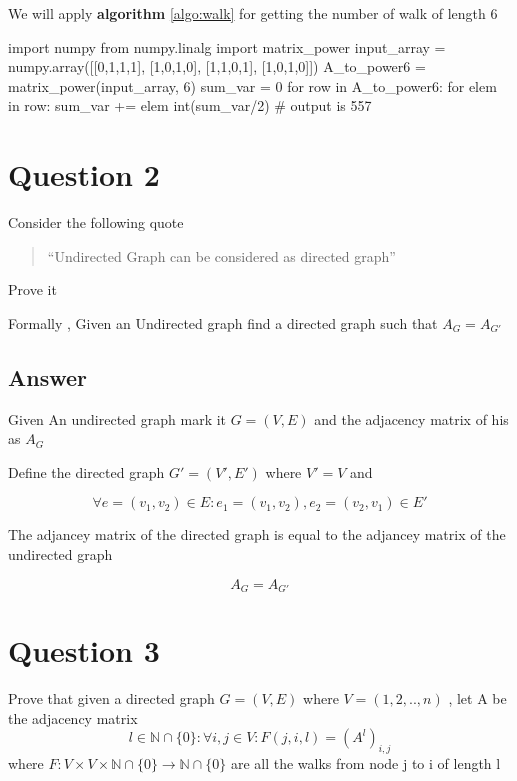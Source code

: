 \documentclass[9pt,twocolumn]{article}
\begin{document}
We will apply \textbf{algorithm} \ref{algo:walk}  for getting the number of walk of length 6

\label{calculate:walks}
\begin{python}
import numpy
from numpy.linalg import matrix_power
input_array = numpy.array([[0,1,1,1],
                           [1,0,1,0],
                           [1,1,0,1],
                           [1,0,1,0]])
A_to_power6 = matrix_power(input_array, 6)
sum_var = 0
for row in A_to_power6:
    for elem in row:
        sum_var += elem
int(sum_var/2)
# output is 557
\end{python}



\section*{Question 2}
\label{sec:org1d26e99}
Consider the following quote
\begin{quote}
``Undirected Graph can be considered as directed graph''
\end{quote}
Prove it

Formally , Given an Undirected graph find a directed graph such that \(A_G = A_{G'}\)


\subsection*{Answer}
\label{sec:org86b991f}
Given An undirected graph mark it \(G=(V,E)\) and the adjacency matrix of his as \(A_G\)

Define the directed graph \(G'=(V',E')\) where \(V'=V\) and

\[ \forall e=(v_1,v_2)\in E : e_1=(v_1,v_2) , e_2=(v_2,v_1)\in E'  \]

The adjancey matrix of the directed graph is equal to the adjancey matrix of the undirected graph

\[ A_G=A_{G'} \]



\section*{Question 3}
\label{sec:orgc997ab0}
Prove that given a directed graph \(G=(V,E)\) where \(V=(1,2,..,n)\) , let A be the adjacency matrix
\[ l \in \mathbb{N}\cap{\{0\}}: \forall i,j\in V : F(j,i ,l)=(A^l)_{i,j} \]
where \(F:V \times V \times \mathbb{N}\cap{\{0\}} \rightarrow \mathbb{N}\cap{\{0\}}\)
are all the walks from node j to i of length l
\end{document}
